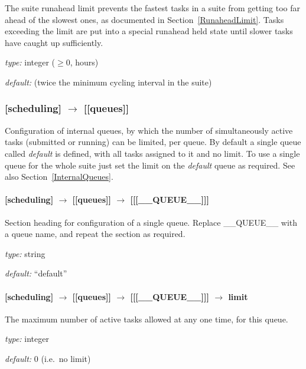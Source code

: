 The suite runahead limit prevents the fastest tasks in a suite from
getting too far ahead of the slowest ones, as documented in
Section~\ref{RunaheadLimit}. Tasks exceeding the limit are put into
a special runahead held state until slower tasks have caught up
sufficiently. 
\begin{myitemize}
    \item {\em type:} integer ($\geq 0$, hours)
    \item {\em default:} (twice the minimum cycling interval in the suite)
\end{myitemize}

\subsubsection[{[[}queues{]]}]{[scheduling] $\rightarrow$ [[queues]]}

Configuration of internal queues, by which the number of simultaneously
active tasks (submitted or running) can be limited, per queue. By
default a single queue called {\em default} is defined, with all tasks 
assigned to it and no limit. To use a single queue for the whole suite 
just set the limit on the {\em default} queue as required.
See also Section~\ref{InternalQueues}.

\paragraph[{[[[}\_\_QUEUE\_\_{]]]}]{[scheduling] $\rightarrow$ [[queues]] $\rightarrow$ [[[\_\_QUEUE\_\_]]]}

Section heading for configuration of a single queue. Replace
\_\_QUEUE\_\_ with a queue name, and repeat the section as required.

\begin{myitemize}
\item {\em type:} string
\item {\em default:} ``default''
\end{myitemize}

\paragraph[limit]{[scheduling] $\rightarrow$ [[queues]] $\rightarrow$ [[[\_\_QUEUE\_\_]]] $\rightarrow$ limit}

The maximum number of active tasks allowed at any one time, for this queue.
\begin{myitemize}
\item {\em type:} integer
\item {\em default:} 0 (i.e.\ no limit)
\end{myitemize}

